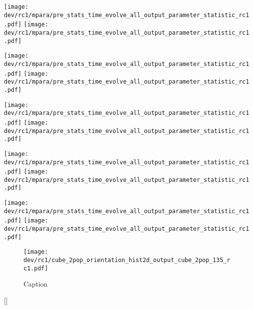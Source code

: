 \begin{sidewaysfigure}[]
\centering
\texttt{[image: dev/rc1/mpara/pre\_stats\_time\_evolve\_all\_output\_parameter\_statistic\_rc1.pdf]}
\texttt{[image: dev/rc1/mpara/pre\_stats\_time\_evolve\_all\_output\_parameter\_statistic\_rc1.pdf]}
\label{app:pste1}
\end{sidewaysfigure}
% 
\begin{sidewaysfigure}[]
\centering
\texttt{[image: dev/rc1/mpara/pre\_stats\_time\_evolve\_all\_output\_parameter\_statistic\_rc1.pdf]}
\texttt{[image: dev/rc1/mpara/pre\_stats\_time\_evolve\_all\_output\_parameter\_statistic\_rc1.pdf]}
\label{app:pste2}
\end{sidewaysfigure}
% 
\begin{sidewaysfigure}[]
\centering
\texttt{[image: dev/rc1/mpara/pre\_stats\_time\_evolve\_all\_output\_parameter\_statistic\_rc1.pdf]}
\texttt{[image: dev/rc1/mpara/pre\_stats\_time\_evolve\_all\_output\_parameter\_statistic\_rc1.pdf]}
\label{app:pste3}
\end{sidewaysfigure}
% 
\begin{sidewaysfigure}[]
\centering
\texttt{[image: dev/rc1/mpara/pre\_stats\_time\_evolve\_all\_output\_parameter\_statistic\_rc1.pdf]}
\texttt{[image: dev/rc1/mpara/pre\_stats\_time\_evolve\_all\_output\_parameter\_statistic\_rc1.pdf]}
\label{app:pste4}
\end{sidewaysfigure}
% 
\begin{sidewaysfigure}[]
\centering
\texttt{[image: dev/rc1/mpara/pre\_stats\_time\_evolve\_all\_output\_parameter\_statistic\_rc1.pdf]}
\texttt{[image: dev/rc1/mpara/pre\_stats\_time\_evolve\_all\_output\_parameter\_statistic\_rc1.pdf]}
\label{app:pste5}
\end{sidewaysfigure}
% 
\begin{figure}
    \centering
    \texttt{[image: dev/rc1/cube\_2pop\_orientation\_hist2d\_output\_cube\_2pop\_135\_rc1.pdf]}
    \caption{Caption}
    \label{fig:modelHistOrientation}
\end{figure}[]
% 
% 
% 
